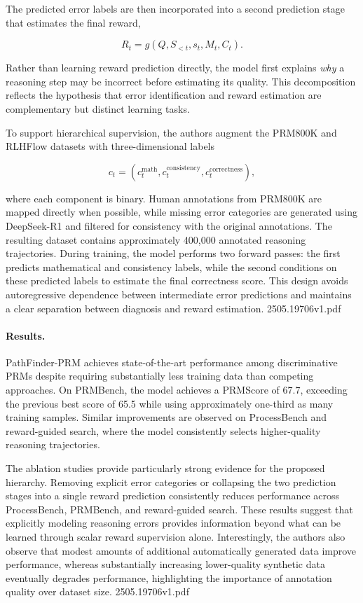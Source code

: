 \documentclass[11pt]{article}
\begin{document}
The predicted error labels are then incorporated into a second prediction stage that estimates the final reward,

\[
R_t
=
g(Q,S_{<t},s_t,M_t,C_t).
\]

Rather than learning reward prediction directly, the model first explains \emph{why} a reasoning step may be incorrect before estimating its quality. This decomposition reflects the hypothesis that error identification and reward estimation are complementary but distinct learning tasks.

To support hierarchical supervision, the authors augment the PRM800K and RLHFlow datasets with three-dimensional labels

\[
c_t
=
(c_t^{\mathrm{math}},
c_t^{\mathrm{consistency}},
c_t^{\mathrm{correctness}}),
\]

where each component is binary. Human annotations from PRM800K are mapped directly when possible, while missing error categories are generated using DeepSeek-R1 and filtered for consistency with the original annotations. The resulting dataset contains approximately 400,000 annotated reasoning trajectories. During training, the model performs two forward passes: the first predicts mathematical and consistency labels, while the second conditions on these predicted labels to estimate the final correctness score. This design avoids autoregressive dependence between intermediate error predictions and maintains a clear separation between diagnosis and reward estimation. 2505.19706v1.pdf

\paragraph{Results.}
PathFinder-PRM achieves state-of-the-art performance among discriminative PRMs despite requiring substantially less training data than competing approaches. On PRMBench, the model achieves a PRMScore of 67.7, exceeding the previous best score of 65.5 while using approximately one-third as many training samples. Similar improvements are observed on ProcessBench and reward-guided search, where the model consistently selects higher-quality reasoning trajectories.

The ablation studies provide particularly strong evidence for the proposed hierarchy. Removing explicit error categories or collapsing the two prediction stages into a single reward prediction consistently reduces performance across ProcessBench, PRMBench, and reward-guided search. These results suggest that explicitly modeling reasoning errors provides information beyond what can be learned through scalar reward supervision alone. Interestingly, the authors also observe that modest amounts of additional automatically generated data improve performance, whereas substantially increasing lower-quality synthetic data eventually degrades performance, highlighting the importance of annotation quality over dataset size. 2505.19706v1.pdf
\end{document}
